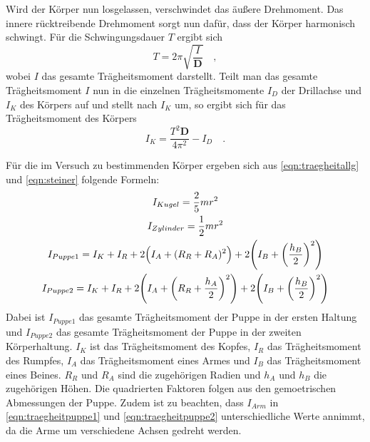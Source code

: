Wird der Körper nun losgelassen, verschwindet das äußere Drehmoment. Das innere
rücktreibende Drehmoment sorgt nun dafür, dass der Körper harmonisch schwingt.
Für die Schwingungsdauer $T$ ergibt sich
\begin{equation}
  T=2\pi\sqrt{\frac{I}{\symbf{D}}}\quad,
  \label{eqn:schwingung}
\end{equation}
wobei $I$ das gesamte Trägheitsmoment darstellt. Teilt man das gesamte Trägheitsmoment
$I$ nun in die einzelnen Trägheitsmomente $I_D$ der Drillachse und
$I_K$ des Körpers auf und stellt nach $I_K$ um, so ergibt sich für
das Trägheitsmoment des Körpers
\begin{equation}
  I_K=\frac{T^2 \symbf{D}}{4\pi^2}-I_D\quad.
  \label{eqn:traegheitschwingung}
\end{equation}

Für die im Versuch zu bestimmenden Körper ergeben sich aus \eqref{eqn:traegheitallg}
und \eqref{eqn:steiner} folgende Formeln:
\begin{gather}
  I_{Kugel}=\frac{2}{5}mr^2
  \label{eqn:traegheitkugel} \\
  I_{Zylinder}=\frac{1}{2}mr^2
  \label{eqn:traegheitzylinder} \\
  \begin{split}
    I_{Puppe1}=I_{K}+I_{R}
    +2\Bigl(I_{A}+(R_{R}+R_{A})^2\Bigr)
    +2\Biggl(I_{B}+\biggl(\frac{h_{B}}{2}\biggr)^2\Biggr)
    \label{eqn:traegheitpuppe1}
  \end{split}
  \\
  \begin{split}
    I_{Puppe2}=I_{K}+I_{R}
    +2\Biggl(I_{A}+\biggl(R_{R}+\frac{h_{A}}{2}\biggr)^2\Biggr)
    +2\Biggl(I_{B}+\biggl(\frac{h_{B}}{2}\biggr)^2\Biggr)
    \label{eqn:traegheitpuppe2}
  \end{split}
\end{gather}
Dabei ist $I_{Puppe1}$ das gesamte Trägheitsmoment der Puppe in der ersten
Haltung und $I_{Puppe2}$ das gesamte Trägheitsmoment der Puppe in der
zweiten Körperhaltung. $I_{K}$ ist das Trägheitsmoment des Kopfes, $I_{R}$
das Trägheitsmoment des Rumpfes, $I_{A}$ das Trägheitsmoment eines Armes und
$I_{B}$ das Trägheitsmoment eines Beines. $R_R$ und $R_A$ sind die zugehörigen
Radien und $h_A$ und $h_B$ die zugehörigen Höhen. Die quadrierten Faktoren folgen
aus den gemoetrischen Abmessungen der Puppe. Zudem ist zu beachten, dass $I_{Arm}$
in \eqref{eqn:traegheitpuppe1} und \eqref{eqn:traegheitpuppe2} unterschiedliche Werte
annimmt, da die Arme um verschiedene Achsen gedreht werden.

